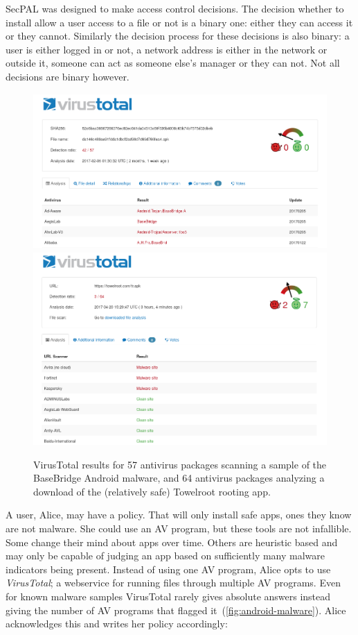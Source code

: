 \documentclass[thesis.tex]{subfiles}
\begin{document}
SecPAL was designed to make access control decisions. The decision whether to
install allow a user access to a file or not is a binary one: either they can
access it or they cannot. Similarly the decision process for these decisions is
also binary: a user is either logged in or not, a network address is either in
the network or outside it, someone can act as someone else's manager or they can
not. Not all decisions are binary however.

\begin{figure}
  \centering
  \includegraphics[width=0.49\linewidth]{figures/android-malware.png}
  \includegraphics[width=0.49\linewidth]{figures/towelroot.png}
  \caption[VirusTotal results for two Android apps.]{VirusTotal results for 57
    antivirus packages scanning a sample of the BaseBridge Android malware, and 64
    antivirus packages analyzing a download of the (relatively safe) Towelroot
    rooting app.}
  \label{fig:android-malware}
\end{figure}

A user, Alice, may have a policy. That will only install safe apps, ones they
know are not malware. She could use an \ac{AV} program, but these tools are not
infallible. Some change their mind about apps over time. Others are heuristic
based and may only be capable of judging an app based on sufficiently many
malware indicators being present. Instead of using one \ac{AV} program, Alice
opts to use \emph{VirusTotal}; a webservice for running files through multiple
\ac{AV} programs. Even for known malware samples VirusTotal rarely gives
absolute answers instead giving the number of \ac{AV} programs that flagged
it~(\autoref{fig:android-malware}). Alice acknowledges this and writes her
policy accordingly:
\end{document}

